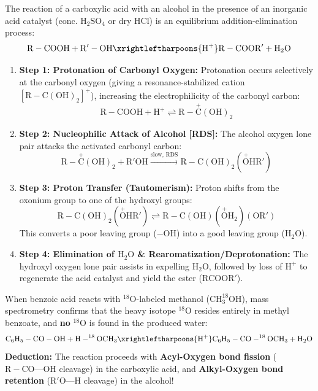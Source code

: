 \documentclass[10pt,twoside,openright]{book}
\begin{document}
\begin{conceptbox}
The reaction of a carboxylic acid with an alcohol in the presence of an inorganic acid catalyst (conc. $\mathrm{H_2SO_4}$ or dry $\mathrm{HCl}$) is an equilibrium addition-elimination process:
\begin{equation}
  \mathrm{R-COOH} + \mathrm{R'-OH} \xrightleftharpoons{\mathrm{H^+}} \mathrm{R-COOR'} + \mathrm{H_2O}
\end{equation}
\begin{enumerate}[leftmargin=*]
  \item \textbf{Step 1: Protonation of Carbonyl Oxygen:}
  Protonation occurs selectively at the carbonyl oxygen (giving a resonance-stabilized cation $[\mathrm{R-C(OH)_2}]^+$), increasing the electrophilicity of the carbonyl carbon:
  \begin{equation}
    \mathrm{R-COOH} + \mathrm{H^+} \rightleftharpoons \mathrm{R-\overset{+}{C}(OH)_2}
  \end{equation}
  \item \textbf{Step 2: Nucleophilic Attack of Alcohol [RDS]:}
  The alcohol oxygen lone pair attacks the activated carbonyl carbon:
  \begin{equation}
    \mathrm{R-\overset{+}{C}(OH)_2} + \mathrm{R'OH} \xrightarrow{\text{slow, RDS}} \mathrm{R-C(OH)_2(\overset{+}{O}HR')}
  \end{equation}
  \item \textbf{Step 3: Proton Transfer (Tautomerism):}
  Proton shifts from the oxonium group to one of the hydroxyl groups:
  \begin{equation}
    \mathrm{R-C(OH)_2(\overset{+}{O}HR')} \rightleftharpoons \mathrm{R-C(OH)(\overset{+}{O}H_2)(OR')}
  \end{equation}
  This converts a poor leaving group ($-\mathrm{OH}$) into a good leaving group ($\mathrm{H_2O}$).
  \item \textbf{Step 4: Elimination of $\mathrm{H_2O}$ \& Rearomatization/Deprotonation:}
  The hydroxyl oxygen lone pair assists in expelling $\mathrm{H_2O}$, followed by loss of $\mathrm{H}^+$ to regenerate the acid catalyst and yield the ester ($\mathrm{RCOOR'}$).
\end{enumerate}
\end{conceptbox}

\begin{ncertbox}
When benzoic acid reacts with $^{18}\mathrm{O}$-labeled methanol ($\mathrm{CH_3^{18}OH}$), mass spectrometry confirms that the heavy isotope $^{18}\mathrm{O}$ resides entirely in methyl benzoate, and \textbf{no} $^{18}\mathrm{O}$ is found in the produced water:
\begin{equation}
  \mathrm{C_6H_5-CO-OH} + \mathrm{H-^{18}OCH_3} \xrightleftharpoons{\mathrm{H^+}} \mathrm{C_6H_5-CO-^{18}OCH_3} + \mathrm{H_2O}
\end{equation}
\textbf{Deduction:} The reaction proceeds with \textbf{Acyl-Oxygen bond fission} ($\mathrm{R-CO\text{---}OH}$ cleavage) in the carboxylic acid, and \textbf{Alkyl-Oxygen bond retention} ($\mathrm{R'O\text{---}H}$ cleavage) in the alcohol!
\end{ncertbox}
\end{document}
